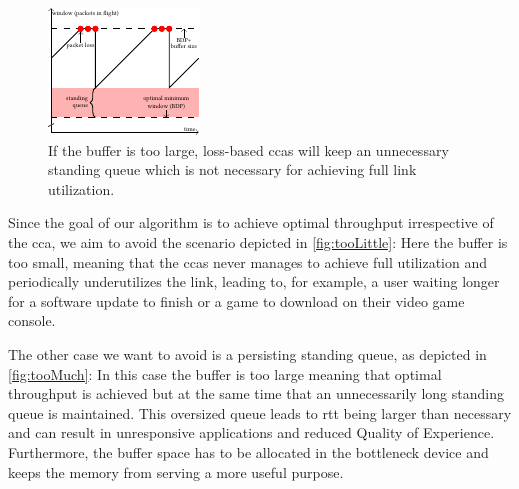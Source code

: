\documentclass[10pt,sigconf,letterpaper,dvipsnames\ifx\removeHeaders\tempYes ,nonacm\fi]{acmart}
\begin{document}
\begin{figure}[h]
\includegraphics[width=\columnwidth]{figures/cocoa_illustration_too_much.pdf}
\caption{If the buffer is too large, loss-based \glspl{cca} will keep an unnecessary standing queue which is not necessary for achieving full link utilization.}
\label{fig:tooMuch}
\end{figure}

Since the goal of our algorithm is to achieve optimal throughput irrespective of the \gls{cca}, we aim to avoid the scenario depicted in \autoref{fig:tooLittle}: Here the buffer is too small, meaning that the \glspl{cca} never manages to achieve full utilization and periodically underutilizes the link, leading to, for example, a user waiting longer for a software update to finish or a game to download on their video game console. 

The other case we want to avoid is a persisting standing queue, as depicted in \autoref{fig:tooMuch}: In this case the buffer is too large meaning that optimal throughput is achieved but at the same time that an unnecessarily long standing queue is maintained. This oversized queue leads to \gls{rtt} being larger than necessary and can result in unresponsive applications and reduced Quality of Experience. Furthermore, the buffer space has to be allocated in the bottleneck device and keeps the memory from serving a more useful purpose. 
\end{document}
